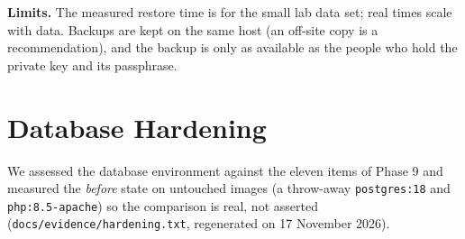 \documentclass[10pt,a4paper]{article}
\newcommand{\code}[1]{\nolinkurl{#1}}
\begin{document}
\textbf{Limits.} The measured restore time is for the small lab data set; real times scale with data. Backups are kept on the same host (an off-site copy is a recommendation), and the backup is only as available as the people who hold the private key and its passphrase.
\section{Database Hardening}\label{sec:harden}
We assessed the database environment against the eleven items of Phase 9 and measured the \emph{before} state on untouched images (a throw-away \code{postgres:18} and \code{php:8.5-apache}) so the comparison is real, not asserted (\code{docs/evidence/hardening.txt}, regenerated on 17 November 2026).
\end{document}
